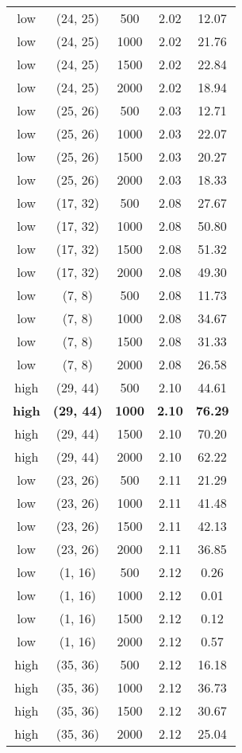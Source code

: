 \begin{tabular}{c c c c c}
low & (24, 25) &  500 & 2.02 & 12.07 \\
low & (24, 25) &  1000 & 2.02 & 21.76 \\
low & (24, 25) &  1500 & 2.02 & 22.84 \\
low & (24, 25) &  2000 & 2.02 & 18.94 \\
low & (25, 26) &  500 & 2.03 & 12.71 \\
low & (25, 26) &  1000 & 2.03 & 22.07 \\
low & (25, 26) &  1500 & 2.03 & 20.27 \\
low & (25, 26) &  2000 & 2.03 & 18.33 \\
low & (17, 32) &  500 & 2.08 & 27.67 \\
low & (17, 32) &  1000 & 2.08 & 50.80 \\
low & (17, 32) &  1500 & 2.08 & 51.32 \\
low & (17, 32) &  2000 & 2.08 & 49.30 \\
low & (7, 8) &  500 & 2.08 & 11.73 \\
low & (7, 8) &  1000 & 2.08 & 34.67 \\
low & (7, 8) &  1500 & 2.08 & 31.33 \\
low & (7, 8) &  2000 & 2.08 & 26.58 \\
high & (29, 44) &  500 & 2.10 & 44.61 \\
\textbf{high} & \textbf{(29, 44)} & \textbf{ 1000} & \textbf{2.10} & \textbf{76.29} \\
high & (29, 44) &  1500 & 2.10 & 70.20 \\
high & (29, 44) &  2000 & 2.10 & 62.22 \\
low & (23, 26) &  500 & 2.11 & 21.29 \\
low & (23, 26) &  1000 & 2.11 & 41.48 \\
low & (23, 26) &  1500 & 2.11 & 42.13 \\
low & (23, 26) &  2000 & 2.11 & 36.85 \\
low & (1, 16) &  500 & 2.12 & 0.26 \\
low & (1, 16) &  1000 & 2.12 & 0.01 \\
low & (1, 16) &  1500 & 2.12 & 0.12 \\
low & (1, 16) &  2000 & 2.12 & 0.57 \\
high & (35, 36) &  500 & 2.12 & 16.18 \\
high & (35, 36) &  1000 & 2.12 & 36.73 \\
high & (35, 36) &  1500 & 2.12 & 30.67 \\
high & (35, 36) &  2000 & 2.12 & 25.04 \\

\end{tabular}
